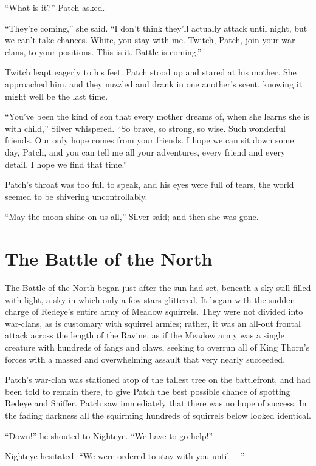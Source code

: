 \documentclass[12pt]{memoir}
\begin{document}
“What is it?” Patch asked.

“They’re coming,” she said. “I don’t think they’ll actually attack
until night, but we can’t take chances. White, you stay with
me. Twitch, Patch, join your war-clans, to your positions. This is
it. Battle is coming.”

Twitch leapt eagerly to his feet. Patch stood up and stared at his
mother. She approached him, and they nuzzled and drank in one
another’s scent, knowing it might well be the last time.

“You’ve been the kind of son that every mother dreams of, when she
learns she is with child,” Silver whispered. “So brave, so strong, so
wise. Such wonderful friends. Our only hope comes from your friends. I
hope we can sit down some day, Patch, and you can tell me all your
adventures, every friend and every detail. I hope we find that time.”

Patch’s throat was too full to speak, and his eyes were full of tears,
the world seemed to be shivering uncontrollably.

“May the moon shine on us all,” Silver said; and then she was gone.


\section{The Battle of the North}

The Battle of the North began just after the sun had set, beneath a
sky still filled with light, a sky in which only a few stars
glittered. It began with the sudden charge of Redeye’s entire army of
Meadow squirrels. They were not divided into war-clans, as is
customary with squirrel armies; rather, it was an all-out frontal
attack across the length of the Ravine, as if the Meadow army was a
single creature with hundreds of fangs and claws, seeking to overrun
all of King Thorn’s forces with a massed and overwhelming assault that
very nearly succeeded.

Patch’s war-clan was stationed atop of the tallest tree on the
battlefront, and had been told to remain there, to give Patch the best
possible chance of spotting Redeye and Sniffer. Patch saw immediately
that there was no hope of success. In the fading darkness all the
squirming hundreds of squirrels below looked identical.

“Down!” he shouted to Nighteye. “We have to go help!”

Nighteye hesitated. “We were ordered to stay with you until —”
\end{document}
